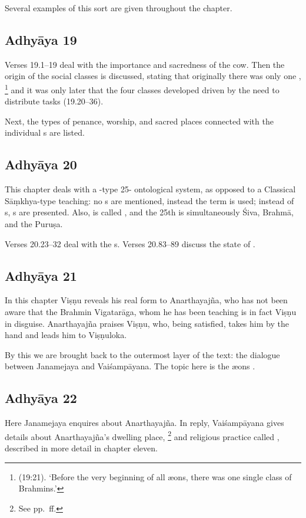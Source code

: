 Several examples of this sort are given throughout the chapter. 

\subsection*{Adhyāya 19}\label{contents_of_ch19}
Verses 19.1--19 deal with the importance and sacredness of the cow.
Then the origin of the social classes  is discussed, stating
that originally there was only one ,%
                \footnote{ (19:21).
                `Before the very beginning of all \ae ons, 
                 there was one single class of Brahmins.'}
and it was only later that the four classes developed driven by the need to
distribute tasks (19.20--36).

Next, the types of penance, worship, and sacred places 
connected with the individual s are listed.


\subsection*{Adhyāya 20}\label{contents_of_ch20}
This chapter deals with a \MBh-type 25- ontological system,
as opposed to a Classical Sāṃkhya-type teaching: no s are mentioned,
instead the term  is used; instead of s, s
are presented. Also,  is called , and the 25th 
is simultaneously Śiva, Brahmā, and the Puruṣa.

Verses 20.23--32 deal with the s. 
Verses 20.83--89 discuss the state of .


\subsection*{Adhyāya 21}\label{contents_of_ch21}
In this chapter Viṣṇu reveals his real form to Anarthayajña, who 
has not been aware that the Brahmin Vigatarāga, whom he has been 
teaching is in fact Viṣṇu in disguise. Anarthayajña praises Viṣṇu,
who, being satisfied, takes him by the hand and leads him to Viṣṇuloka.

By this we are brought back to the outermost layer of the text:
the dialogue between Janamejaya and Vaiśampāyana.
The topic here is the \ae ons .

\subsection*{Adhyāya 22}\label{contents_of_ch22}
Here Janamejaya enquires about Anarthayajña.
In reply, Vaiśampāyana gives details about Anarthayajña's dwelling place,%
                \footnote{See pp.~\pageref{anarthayajnas_asrama}ff.}
and religious practice called , described in more detail in chapter eleven. 


